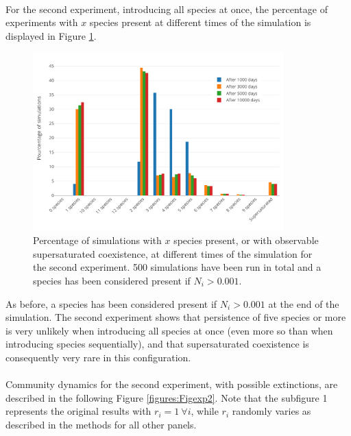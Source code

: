 \\
For the second experiment, introducing all species at once, the percentage of experiments with $x$ species present at different times of the simulation is displayed in Figure \ref{figures:Figexp2bar}.\\

\begin{figure}[H]
	\begin{center} 
		\includegraphics[width=0.86\textwidth]{../Code/Figures/Figure_exp2_bar.pdf}
 		\caption{Percentage of simulations with $x$ species present, or with observable supersaturated coexistence, at different times of the simulation for the second experiment. 500 simulations have been run in total and a species has been considered present if $N_i > 0.001$.}
 		\label{figures:Figexp2bar}
	\end{center}
\end{figure}

As before, a species has been considered present if $N_i > 0.001$ at the end of the simulation. The second experiment shows that persistence of five species or more is very unlikely when introducing all species at once (even more so than when introducing species sequentially), and that supersaturated coexistence is consequently very rare in this configuration.\\
\\
Community dynamics for the second experiment, with possible extinctions, are described in the following Figure \ref{figures:Figexp2}. Note that the subfigure 1 represents the original results with $r_i=1 ~\forall i$, while $r_i$ randomly varies as described in the methods for all other panels.

